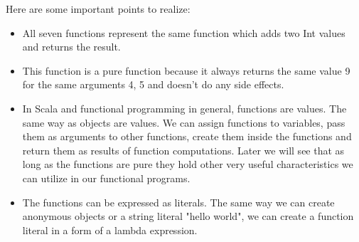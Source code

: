 \documentclass[12pt,twoside,a4paper]{report}
\begin{document}
Here are some important points to realize:

\begin{itemize}
\item All seven functions represent the same function which adds two Int values and returns the result.
\item This function is a pure function because it always returns the same value 9 for the same arguments 4, 5 and doesn't do any side effects.
\item In Scala and functional programming in general, functions are values. The same way as objects are values. We can assign functions to variables, pass them as arguments to other functions, create them inside the functions and return them as results of function computations. Later we will see that as long as the functions are pure they hold other very useful characteristics we can utilize in our functional programs.
\item The functions can be expressed as literals. The same way we can create anonymous objects or a string literal "hello world", we can create a function literal in a form of a lambda expression.
\end{itemize}
\end{document}
